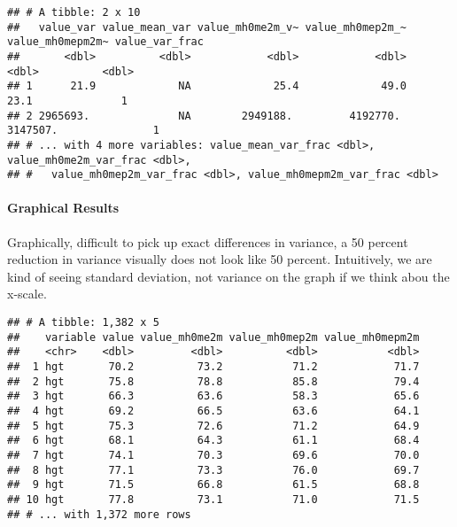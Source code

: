 \documentclass[
]{book}
\newenvironment{Shaded}{\begin{snugshade}}{\end{snugshade}}
\newcommand{\KeywordTok}[1]{\textcolor[rgb]{0.13,0.29,0.53}{\textbf{#1}}}
\newcommand{\NormalTok}[1]{#1}
\newcommand{\OperatorTok}[1]{\textcolor[rgb]{0.81,0.36,0.00}{\textbf{#1}}}
\newcommand{\StringTok}[1]{\textcolor[rgb]{0.31,0.60,0.02}{#1}}
\begin{document}
\begin{verbatim}
## # A tibble: 2 x 10
##   value_var value_mean_var value_mh0me2m_v~ value_mh0mep2m_~ value_mh0mepm2m~ value_var_frac
##       <dbl>          <dbl>            <dbl>            <dbl>            <dbl>          <dbl>
## 1      21.9             NA             25.4             49.0             23.1              1
## 2 2965693.              NA        2949188.         4192770.         3147507.               1
## # ... with 4 more variables: value_mean_var_frac <dbl>, value_mh0me2m_var_frac <dbl>,
## #   value_mh0mep2m_var_frac <dbl>, value_mh0mepm2m_var_frac <dbl>
\end{verbatim}

\hypertarget{graphical-results}{%
\paragraph{Graphical Results}\label{graphical-results}}

Graphically, difficult to pick up exact differences in variance, a 50 percent reduction in variance visually does not look like 50 percent. Intuitively, we are kind of seeing standard deviation, not variance on the graph if we think abou the x-scale.

\begin{Shaded}
\end{Shaded}

\begin{verbatim}
## # A tibble: 1,382 x 5
##    variable value value_mh0me2m value_mh0mep2m value_mh0mepm2m
##    <chr>    <dbl>         <dbl>          <dbl>           <dbl>
##  1 hgt       70.2          73.2           71.2            71.7
##  2 hgt       75.8          78.8           85.8            79.4
##  3 hgt       66.3          63.6           58.3            65.6
##  4 hgt       69.2          66.5           63.6            64.1
##  5 hgt       75.3          72.6           71.2            64.9
##  6 hgt       68.1          64.3           61.1            68.4
##  7 hgt       74.1          70.3           69.6            70.0
##  8 hgt       77.1          73.3           76.0            69.7
##  9 hgt       71.5          66.8           61.5            68.8
## 10 hgt       77.8          73.1           71.0            71.5
## # ... with 1,372 more rows
\end{verbatim}
\end{document}
